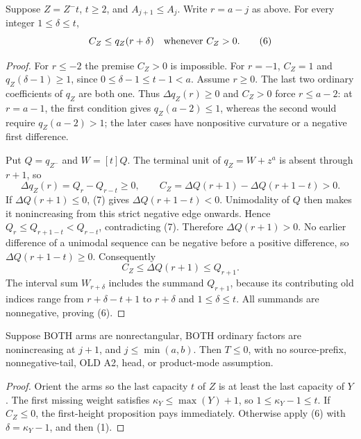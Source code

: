 \begin{lemma}
Suppose $Z=Z^-t$, $t\ge2$, and $A_{j+1}\le A_j$.
Write $r=a-j$ as above. For every integer $1\le\delta\le t$,
\[
                    C_Z\le q_Z(r+\delta)
                 \quad\hbox{whenever }C_Z>0.        \tag{6}
\]
\end{lemma}
\begin{proof}
For $r\le-2$ the premise $C_Z>0$ is impossible. For $r=-1$,
$C_Z=1$ and $q_Z(\delta-1)\ge1$, since
$0\le\delta-1\le t-1<a$. Assume $r\ge0$.
The last two ordinary coefficients of $q_Z$ are both one.
Thus $\Delta q_Z(r)\ge0$ and $C_Z>0$ force $r\le a-2$:
at $r=a-1$, the first condition gives $q_Z(a-2)\le1$, whereas
the second would require $q_Z(a-2)>1$; the later cases have
nonpositive curvature or a negative first difference.

Put $Q=q_{Z^-}$ and $W=[t]Q$. The terminal unit of
$q_Z=W+z^a$ is absent through $r+1$, so
\[
 \Delta q_Z(r)=Q_r-Q_{r-t}\ge0,\qquad
 C_Z=\Delta Q(r+1)-\Delta Q(r+1-t)>0.                \tag{7}
\]
If $\Delta Q(r+1)\le0$, (7) gives
$\Delta Q(r+1-t)<0$. Unimodality of $Q$ then makes it
nonincreasing from this strict negative edge onwards. Hence
$Q_r\le Q_{r+1-t}<Q_{r-t}$, contradicting (7).
Therefore $\Delta Q(r+1)>0$. No earlier difference of a
unimodal sequence can be negative before a positive difference,
so $\Delta Q(r+1-t)\ge0$. Consequently
\[
 C_Z\le\Delta Q(r+1)\le Q_{r+1}.
\]
The interval sum $W_{r+\delta}$ includes the summand $Q_{r+1}$,
because its contributing old indices range from
$r+\delta-t+1$ to $r+\delta$ and $1\le\delta\le t$.
All summands are nonnegative, proving (6).
\end{proof}

\begin{theorem}
Suppose BOTH arms are nonrectangular, BOTH ordinary factors
are nonincreasing at $j+1$, and
$j\le\min(a,b)$. Then $T\le0$, with no source-prefix,
nonnegative-tail, OLD A2, head, or product-mode assumption.
\end{theorem}
\begin{proof}
Orient the arms so the last capacity $t$ of $Z$ is at least
the last capacity of $Y$. The first missing weight satisfies
$\kappa_Y\le\max(Y)+1$, so $1\le\kappa_Y-1\le t$.
If $C_Z\le0$, the first-height proposition pays immediately.
Otherwise apply (6) with $\delta=\kappa_Y-1$, and then (1).
\end{proof}


